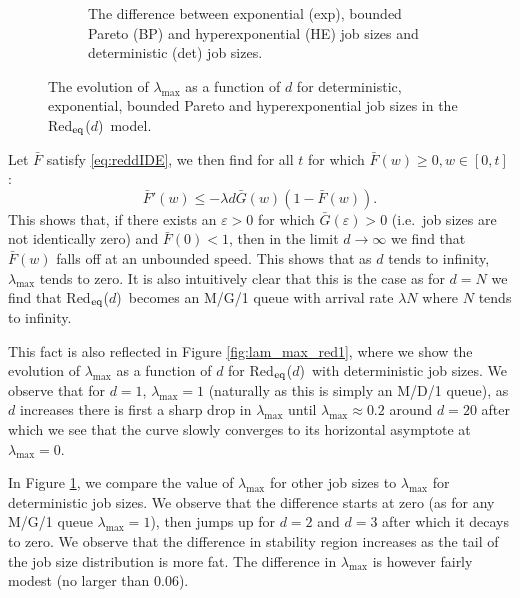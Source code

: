 \documentclass[12pt]{report}
\newcommand{\Redid}{Red$_{\textup{eq}}$($d$)}
\begin{document}
\begin{figure}[t]
\begin{subfigure}{.45\textwidth}
\begin{center}
\caption{The difference between exponential (exp), bounded Pareto (BP) and hyperexponential (HE) job sizes and deterministic (det) job sizes.}
\label{fig:lam_max_red2}
\end{center}
\end{subfigure}
\caption{The evolution of $\lambda_{\max}$ as a function of $d$ for deterministic, exponential, bounded Pareto and hyperexponential job sizes in the \Redid\ model.}
\label{fig:lam_max_red}
\end{figure}
Let $\bar F$ satisfy \eqref{eq:reddIDE}, we then find for all $t$ for which $\bar F(w) \geq 0, w \in [0,t]$:
$$
\bar{F}'(w) \leq -\lambda d \bar G(w) (1-\bar F(w)).
$$
This shows that, if there exists an $\varepsilon>0$ for which $\bar G(\varepsilon)>0$ (i.e.~job sizes are not identically zero) and $\bar F(0) < 1$, then in the limit $d\rightarrow \infty$ we find that $\bar F(w)$ falls off at an unbounded speed. This shows that as $d$ tends to infinity, $\lambda_{\max}$ tends to zero. It is also intuitively clear that this is the case as for $d=N$ we find that \Redid\ becomes an M/G/1 queue with arrival rate $\lambda N$ where $N$ tends to infinity.

This fact is also reflected in Figure \ref{fig:lam_max_red1}, where we show the evolution of $\lambda_{\max}$ as a function of $d$ for \Redid\ with deterministic job sizes. We observe that for $d=1$, $\lambda_{\max}=1$ (naturally as this is simply an M/D/1 queue), as $d$ increases there is first a sharp drop in $\lambda_{\max}$ until $\lambda_{\max} \approx 0.2$ around $d=20$ after which we see that the curve slowly converges to its horizontal asymptote at $\lambda_{\max}=0$.

In Figure \ref{fig:lam_max_red2}, we compare the value of $\lambda_{\max}$ for other job sizes to $\lambda_{\max}$ for deterministic job sizes. We observe that the difference starts at zero (as for any M/G/1 queue $\lambda_{\max}=1$), then jumps up for $d=2$ and $d=3$ after which it decays to zero. We observe that the difference in stability region increases as the tail of the job size distribution is more fat. The difference in $\lambda_{\max}$ is however fairly modest (no larger than $0.06$).
\end{document}
